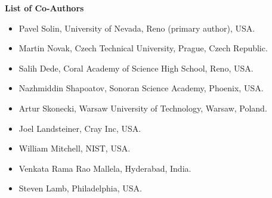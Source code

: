 \documentclass[article,A4,12pt]{llncs}
\begin{document}
{\noindent
{\bf List of Co-Authors}
\begin{itemize}
\item Pavel Solin, University of Nevada, Reno (primary author), USA. 
\item Martin Novak, Czech Technical University, Prague, Czech Republic.
\item Salih Dede, Coral Academy of Science High School, Reno, USA.
\item Nazhmiddin Shapoatov, Sonoran Science Academy, Phoenix, USA.
\item Artur Skonecki, Warsaw University of Technology, Warsaw, Poland.
\item Joel Landsteiner, Cray Inc, USA.
\item William Mitchell, NIST, USA.
\item Venkata Rama Rao Mallela, Hyderabad, India.
\item Steven Lamb, Philadelphia, USA.
\end{itemize}

%
%
%
}
\vspace{8mm}



\newpage
\setcounter{tocdepth}{2}
\tableofcontents

\newpage

\pagestyle{plain}
\setcounter{page}{1}
\end{document}
